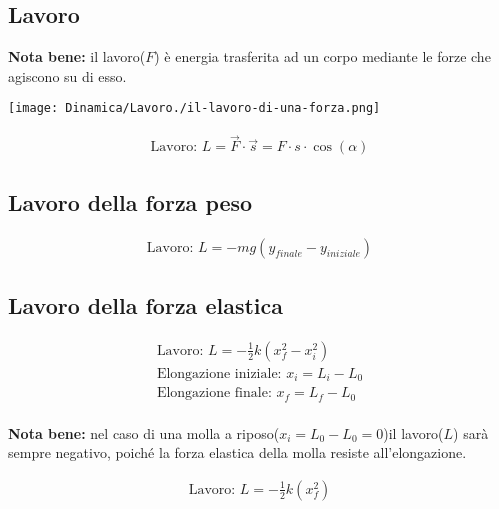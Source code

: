 \subsection{Lavoro}

\textbf{Nota bene: } il lavoro($F$) è energia trasferita ad un corpo mediante le forze che agiscono su di esso. \\
\begin{center}
    \texttt{[image: Dinamica/Lavoro./il-lavoro-di-una-forza.png]}    
\end{center}
\begin{gather*}
    \text{Lavoro: } L = \vec{F} \cdot \vec{s} = F \cdot  s \cdot \cos (\alpha)
\end{gather*}

\subsection{Lavoro della forza peso}

\begin{gather*}
    \text{Lavoro: } L = -mg(y_{finale} - y_{iniziale})
\end{gather*}

\subsection{Lavoro della forza elastica}

\begin{gather*}
    \text{Lavoro: } L = - \frac{1}{2} k (x_f^2 - x_i^2) \\
    \text{Elongazione iniziale: } x_i = L_i - L_0 \\
    \text{Elongazione finale: } x_f = L_f - L_0 \\
\end{gather*}

\textbf{Nota bene: } nel caso di una molla a riposo($x_i = L_0 - L_0 = 0$)il lavoro($L$) sarà sempre negativo, poiché la forza elastica della molla resiste all'elongazione.

\begin{gather*}
    \text{Lavoro: } L = - \frac{1}{2} k (x_f^2)
\end{gather*}
